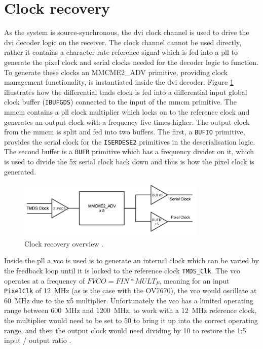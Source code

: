 \section{Clock recovery}
As the system is source-synchronous, the \gls{dvi} clock channel is used to drive the \gls{dvi} decoder logic on the receiver. The clock channel cannot be used directly, rather it contains a character-rate reference signal which is fed into a \gls{pll} to generate the pixel clock and serial clocks needed for the decoder logic to function. To generate these clocks an MMCME2\_ADV primitive, providing clock management functionality, is instantiated inside the \gls{dvi} decoder. Figure \ref{fig:clock_recovery} illustrates how the differential \gls{tmds} clock is fed into a differential input global clock buffer (\texttt{IBUFGDS}) connected to the input of the \gls{mmcm} primitive. The \gls{mmcm} contains a \gls{pll} clock multiplier which locks on to the reference clock and generates an output clock with a frequency five times higher. The output clock from the \gls{mmcm} is split and fed into two buffers. The first, a \texttt{BUFIO} primitive, provides the serial clock for the \texttt{ISERDESE2} primitives in the deserialisation logic. The second buffer is a \texttt{BUFR} primitive which has a frequency divider on it, which is used to divide the 5x serial clock back down and thus is how the pixel clock is generated. 

\begin{figure}
  \centering
  \includegraphics[width=0.8\textwidth]{./img/clock_recovery.png}
  \caption{Clock recovery overview \cite{dvi2rgb}.}
  \label{fig:clock_recovery}
\end{figure}

Inside the \gls{pll} a \gls{vco} is used is to generate an internal clock which can be varied by the feedback loop until it is locked to the reference clock \texttt{TMDS\_Clk}. The \gls{vco} operates at a frequency of \(FVCO = FIN * MULT_F\), meaning for an input \texttt{PixelClk} of \SI{12}{\mega\hertz} (as is the case with the OV7670), the \gls{vco} would oscillate at \SI{60}{\mega\hertz} due to the x5 multiplier. Unfortunately the \gls{vco} has a limited operating range between \SI{600}{\mega\hertz} and \SI{1200}{\mega\hertz}, to work with a \SI{12}{\mega\hertz} reference clock, the multiplier would need to be set to 50 to bring it up into the correct operating range, and then the output clock would need dividing by 10 to restore the 1:5 input / output ratio \cite{xilinx:ds187}.


